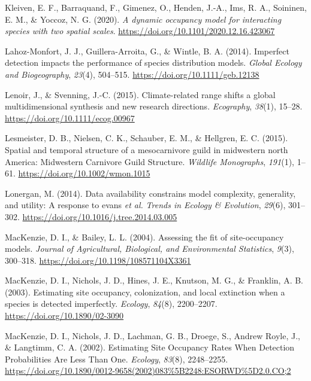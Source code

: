 \documentclass[
]{article}
\newlength{\cslhangindent}
\newenvironment{CSLReferences}[2] %
 {\begin{list}{}{%
  \setlength{\itemindent}{0pt}
  \setlength{\leftmargin}{0pt}
  \setlength{\parsep}{0pt}
  \ifodd #1
   \setlength{\leftmargin}{\cslhangindent}
   \setlength{\itemindent}{-1\cslhangindent}
  \fi
  \setlength{\itemsep}{#2\baselineskip}}}
 {\end{list}}
\begin{document}
\begin{CSLReferences}{1}{0}
Kleiven, E. F., Barraquand, F., Gimenez, O., Henden, J.-A., Ims, R. A.,
Soininen, E. M., \& Yoccoz, N. G. (2020). \emph{A dynamic occupancy
model for interacting species with two spatial scales}.
\url{https://doi.org/10.1101/2020.12.16.423067}

Lahoz-Monfort, J. J., Guillera-Arroita, G., \& Wintle, B. A. (2014).
Imperfect detection impacts the performance of species distribution
models. \emph{Global Ecology and Biogeography}, \emph{23}(4), 504--515.
\url{https://doi.org/10.1111/geb.12138}

Lenoir, J., \& Svenning, J.-C. (2015). Climate-related range shifts
{\textendash} a global multidimensional synthesis and new research
directions. \emph{Ecography}, \emph{38}(1), 15--28.
\url{https://doi.org/10.1111/ecog.00967}

Lesmeister, D. B., Nielsen, C. K., Schauber, E. M., \& Hellgren, E. C.
(2015). Spatial and temporal structure of a mesocarnivore guild in
midwestern north America: Midwestern Carnivore Guild Structure.
\emph{Wildlife Monographs}, \emph{191}(1), 1--61.
\url{https://doi.org/10.1002/wmon.1015}

Lonergan, M. (2014). Data availability constrains model complexity,
generality, and utility: A response to evans {\emph{et al.}}
\emph{Trends in Ecology \& Evolution}, \emph{29}(6), 301--302.
\url{https://doi.org/10.1016/j.tree.2014.03.005}

MacKenzie, D. I., \& Bailey, L. L. (2004). Assessing the fit of
site-occupancy models. \emph{Journal of Agricultural, Biological, and
Environmental Statistics}, \emph{9}(3), 300--318.
\url{https://doi.org/10.1198/108571104X3361}

MacKenzie, D. I., Nichols, J. D., Hines, J. E., Knutson, M. G., \&
Franklin, A. B. (2003). Estimating site occupancy, colonization, and
local extinction when a species is detected imperfectly. \emph{Ecology},
\emph{84}(8), 2200--2207. \url{https://doi.org/10.1890/02-3090}

MacKenzie, D. I., Nichols, J. D., Lachman, G. B., Droege, S., Andrew
Royle, J., \& Langtimm, C. A. (2002). Estimating Site Occupancy Rates
When Detection Probabilities Are Less Than One. \emph{Ecology},
\emph{83}(8), 2248--2255.
\url{https://doi.org/10.1890/0012-9658(2002)083\%5B2248:ESORWD\%5D2.0.CO;2}


\end{CSLReferences}
\end{document}
